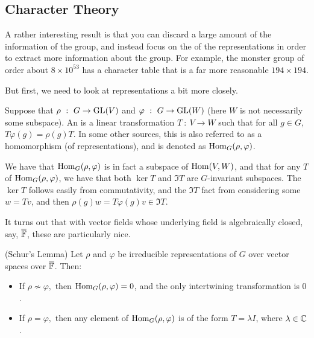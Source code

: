 \documentclass{article}
\renewcommand{\phi}{\varphi}
\begin{document}
\subsection{Character Theory}

A rather interesting result is that you can discard a large amount of the information of the group, and instead focus on the  of the representations in order to extract more information about the group. For example, the monster group of order about $8 \times 10^{53}$ has a character table that is a far more reasonable $194 \times 194$.

But first, we need to look at representations a bit more closely.

\begin{definition}
Suppose that $\rho \ : \ G \to \operatorname{GL}(V)$ and $\phi \ : \ G \to \GL(W)$ (here $W$ is not necessarily some subspace). An  is a linear transformation $T \ : \ V \to W$ such that for all $g \in G$, $T\phi(g) = \rho(g)T$. In some other sources, this is also referred to as a homomorphism (of representations), and is denoted as $\Hom_G(\rho, \phi)$.
\end{definition}

We have that $\Hom_G(\rho, \phi)$ is in fact a subspace of $\operatorname{Hom}(V,W)$, and that for any $T$ of $\Hom_G(\rho,\phi)$, we have that both $\ker T$ and $\Im T$ are $G$-invariant subspaces. The $\ker T$ follows easily from commutativity, and the $\Im T$ fact from considering some $w = Tv$, and then $\rho(g)w = T\phi(g)v \in \Im T$.

It turns out that with vector fields whose underlying field is algebraically closed, say, $\overline{\mathbb F}$, these are particularly nice.
\begin{theorem}
(Schur's Lemma) Let $\rho$ and $\phi$ be irreducible representations of $G$ over vector spaces over $\overline{\mathbb F}$. Then:
\begin{itemize}
    \item If $\rho \not\sim \phi,$ then $\Hom_G(\rho,\phi) = 0$, and the only intertwining transformation is $0$.
    \item If $\rho = \phi,$ then any element of $\Hom_G(\rho,\phi)$ is of the form $T=\lambda I$, where $\lambda \in \mathbb C$.
\end{itemize}
\end{theorem}
\end{document}
